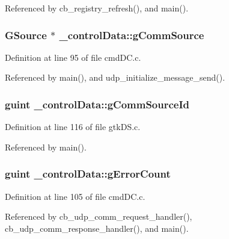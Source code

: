 Referenced by cb\+\_\+registry\+\_\+refresh(), and main().

\hypertarget{struct__control_data_abfbd9e642ba240fa5985f63d60886de4}{
\subsubsection[{g\+Comm\+Source}]{\setlength{\rightskip}{0pt plus 5cm}G\+Source $\ast$ \+\_\+control\+Data\+::g\+Comm\+Source}}\label{struct__control_data_abfbd9e642ba240fa5985f63d60886de4}


Definition at line 95 of file cmd\+D\+C.\+c.



Referenced by main(), and udp\+\_\+initialize\+\_\+message\+\_\+send().

\hypertarget{struct__control_data_a599cefa2edf28b0cf58f9180a3be0a19}{
\subsubsection[{g\+Comm\+Source\+Id}]{\setlength{\rightskip}{0pt plus 5cm}guint \+\_\+control\+Data\+::g\+Comm\+Source\+Id}}\label{struct__control_data_a599cefa2edf28b0cf58f9180a3be0a19}


Definition at line 116 of file gtk\+D\+S.\+c.



Referenced by main().

\hypertarget{struct__control_data_a0dcc9f369186f6cf7c99b2178be66e58}{
\subsubsection[{g\+Error\+Count}]{\setlength{\rightskip}{0pt plus 5cm}guint \+\_\+control\+Data\+::g\+Error\+Count}}\label{struct__control_data_a0dcc9f369186f6cf7c99b2178be66e58}


Definition at line 105 of file cmd\+D\+C.\+c.



Referenced by cb\+\_\+udp\+\_\+comm\+\_\+request\+\_\+handler(), cb\+\_\+udp\+\_\+comm\+\_\+response\+\_\+handler(), and main().

